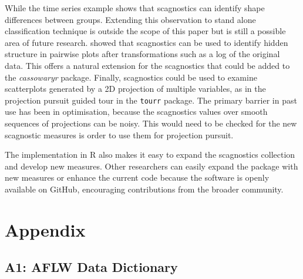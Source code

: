 While the time series example shows that scagnostics can identify shape
differences between groups. Extending this observation to stand alone
classification technique is outside the scope of this paper but is still
a possible area of future research. \citet{hidscags} showed that
scagnostics can be used to identify hidden structure in pairwise plots
after transformations such as a log of the original data. This offers a
natural extension for the scagnostics that could be added to the
\emph{cassowaryr} package. Finally, scagnostics could be used to examine
scatterplots generated by a 2D projection of multiple variables, as in
the projection pursuit guided tour in the \texttt{tourr} package. The
primary barrier in past use has been in optimisation, because the
scagnostics values over smooth sequences of projections can be noisy.
This would need to be checked for the new scagnostic measures is order
to use them for projection pursuit.

The implementation in R also makes it easy to expand the scagnostics
collection and develop new measures. Other researchers can easily expand
the package with new measures or enhance the current code because the
software is openly available on GitHub, encouraging contributions from
the broader community.

\hypertarget{appendix}{%
\section{Appendix}\label{appendix}}

\hypertarget{a1-aflw-data-dictionary}{%
\subsection{A1: AFLW Data Dictionary}\label{a1-aflw-data-dictionary}}

